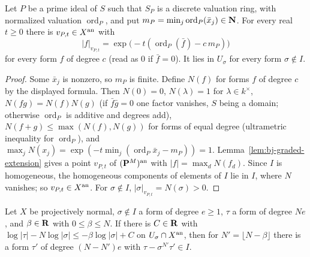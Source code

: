 \begin{lemma}\label{lem:pg-div-points}
\leanok
{}
Let $P$ be a prime ideal of $S$ such that $S_P$ is a discrete valuation ring, with normalized valuation $\operatorname{ord}_P$, and put
$m_P=\min_j\operatorname{ord}_P(\bar x_j)\in\mathbf{N}$. For every real $t\ge0$ there is $v_{P,t}\in X^{\mathrm{an}}$ with
\[
|f|_{v_{P,t}}=\exp\bigl(-t(\operatorname{ord}_P(\bar f)-c\,m_P)\bigr)
\]
for every form $f$ of degree $c$ (read as $0$ if $\bar f=0$). It lies in $U_\sigma$ for every form $\sigma\notin I$.
\end{lemma}

\begin{proof}
Some $\bar x_j$ is nonzero, so $m_P$ is finite. Define $N(f)$ for forms $f$ of degree $c$ by the displayed formula. Then $N(0)=0$,
$N(\lambda)=1$ for $\lambda\in k^\times$, $N(fg)=N(f)N(g)$ (if $\bar f\bar g=0$ one factor vanishes, $S$ being a domain; otherwise
$\operatorname{ord}_P$ is additive and degrees add), $N(f+g)\le\max(N(f),N(g))$ for forms of equal degree (ultrametric inequality for
$\operatorname{ord}_P$), and $\max_jN(x_j)=\exp(-t\min_j(\operatorname{ord}_P\bar x_j-m_P))=1$. Lemma~\ref{lem:bj-graded-extension} gives a point
$v_{P,t}$ of $(\mathbf{P}^M)^{\mathrm{an}}$ with $|f|=\max_dN(f_d)$. Since $I$ is homogeneous, the homogeneous components of elements of $I$ lie in
$I$, where $N$ vanishes; so $v_{P,t}\in X^{\mathrm{an}}$. For $\sigma\notin I$, $|\sigma|_{v_{P,t}}=N(\sigma)>0$.
\end{proof}

\begin{lemma}\label{lem:pg-division}
\leanok
{}
Let $X$ be projectively normal, $\sigma\notin I$ a form of degree $e\ge1$, $\tau$ a form of degree $Ne$, and $\beta\in\mathbf{R}$ with
$0\le\beta\le N$. If there is $C\in\mathbf{R}$ with $\log|\tau|-N\log|\sigma|\le-\beta\log|\sigma|+C$ on $U_\sigma\cap X^{\mathrm{an}}$, then for
$N'=\lfloor N-\beta\rfloor$ there is a form $\tau'$ of degree $(N-N')e$ with $\tau-\sigma^{N'}\tau'\in I$.
\end{lemma}

